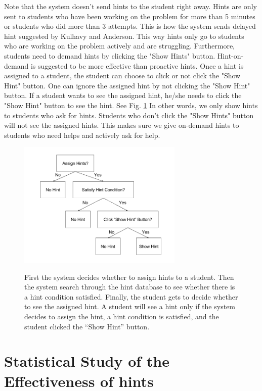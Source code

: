 \documentclass{llncs}
\begin{document}
Note that the system doesn't send hints to the student right away. Hints are only sent to students who have been working on the problem for more than 5 minutes or students who did more than 3 attempts. This is how the system sends delayed hint suggested by Kulhavy and Anderson\cite{Kulhavy1972}. This way hints only go to students who are working on the problem actively and are struggling. Furthermore, students need to demand hints by clicking the "Show Hints" button. Hint-on-demand is suggested to be more effective than proactive hints\cite{Razzaq2010}. Once a hint is assigned to a student, the student can choose to click or not click the "Show Hint" button. One can ignore the assigned hint by not clicking the "Show Hint" button. If a student wants to see the assigned hint, he/she needs to click the "Show Hint" button to see the hint. See Fig. \ref{fig:show_hint} In other words, we only show hints to students who ask for hints. Students who don't click the "Show Hints" button will not see the assigned hints. This makes sure we give on-demand hints to students who need helps and actively ask for help. 

\begin{figure}[ht]
   \centering
   \caption{First the system decides whether to assign hints to a student. Then the system search through the hint database to see whether there is a hint condition satisfied. Finally, the student gets to decide whether to see the assigned hint. A student will see a hint only if the system decides to assign the hint, a hint condition is satisfied, and the student clicked the ``Show Hint'' button.}
   \includegraphics[width=0.7\textwidth]{image/Show_Hint.png}
   \label{fig:show_hint}
\end{figure}


\section{Statistical Study of the Effectiveness of hints}
\end{document}
